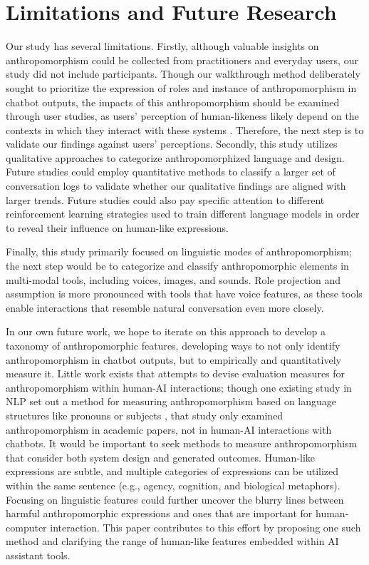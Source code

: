 \section{Limitations and Future Research}

Our study has several limitations. Firstly, although valuable insights on anthropomorphism could be collected from practitioners and everyday users, our study did not include participants. Though our walkthrough method deliberately sought to prioritize the expression of roles and instance of anthropomorphism in chatbot outputs, the impacts of this anthropomorphism should be examined through user studies, as users' perception of human-likeness likely depend on the contexts in which they interact with these systems \citep{nowak2004influence}. Therefore, the next step is to validate our findings against users' perceptions. Secondly, this study utilizes qualitative approaches to categorize anthropomorphized language and design. Future studies could employ quantitative methods to classify a larger set of conversation logs \citep{zhao2024wildchat} to validate whether our qualitative findings are aligned with larger trends. Future studies could also pay specific attention to different reinforcement learning strategies used to train different language models in order to reveal their influence on human-like expressions. 

Finally, this study primarily focused on linguistic modes of anthropomorphism; the next step would be to categorize and classify anthropomorphic elements in multi-modal tools, including voices, images, and sounds. Role projection and assumption is more pronounced with tools that have voice features, as these tools enable interactions that resemble natural conversation even more closely.

In our own future work, we hope to iterate on this approach to develop a taxonomy of anthropomorphic features, developing ways to not only identify anthropomorphism in chatbot outputs, but to empirically and quantitatively measure it. Little work exists that attempts to devise evaluation measures for anthropomorphism within human-AI interactions; though one existing study in NLP set out a method for measuring anthropomorphism based on language structures like pronouns or subjects \citep{cheng2024anthroscore}, that study only examined anthropomorphism in academic papers, not in human-AI interactions with chatbots.  It would be important to seek methods to measure anthropomorphism that consider both system design and generated outcomes. Human-like expressions are subtle, and multiple categories of expressions can be utilized within the same sentence (e.g., agency, cognition, and biological metaphors). Focusing on linguistic features could further uncover the blurry lines between harmful anthropomorphic expressions and ones that are important for human-computer interaction. This paper contributes to this effort by proposing one such method and clarifying the range of human-like features embedded within AI assistant tools. 

